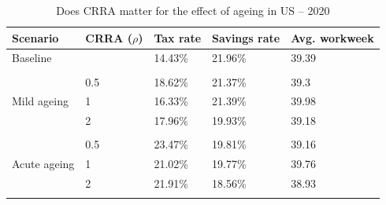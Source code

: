\begin{table}[!htb]
\centering
\begin{threeparttable}
\caption{Does CRRA matter for the effect of ageing in US -- 2020}
\label{table:US:CRRA:ageing}
\renewcommand{\arraystretch}{1.25}
\begin{tabularx}{.9\textwidth}{YYYYY}
\toprule
\textbf{Scenario} & \textbf{CRRA} ($\rho$) & \textbf{Tax rate} & \textbf{Savings rate} & \textbf{Avg. workweek}\\
\midrule 
Baseline &  & 14.43\% & 21.96\% & 39.39 \\[.5em]\hline\\[-.75em]
 & 0.5 & 18.62\% & 21.37\% & 39.3 \\
Mild ageing & 1 & 16.33\% & 21.39\% & 39.98 \\
 & 2 & 17.96\% & 19.93\% & 39.18 \\[.5em]\hline\\[-.75em]
 & 0.5 & 23.47\% & 19.81\% & 39.16 \\
Acute ageing & 1 & 21.02\% & 19.77\% & 39.76 \\
 & 2 & 21.91\% & 18.56\% & 38.93 \\[.5em]\hline\\[-.75em]
 \bottomrule
\end{tabularx}
\end{threeparttable}
\end{table}

